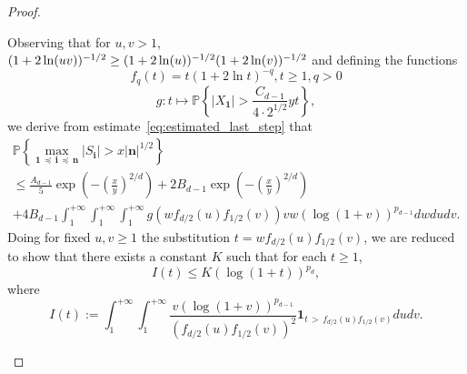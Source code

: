 \documentclass[AHL,Unicode,longabstracts,published]{cedram}
\newcommand{\bfun}{\mathbf{1}}
\newcommand\PP{\mathbb{P}}
\newcommand{\pr}[1]{(#1)}
\newcommand{\gr}[1]{\bm{#1}}
\newcommand{\gri}{\bm{i}}
\newcommand{\grn}{\bm{n}}
\newcommand{\imd}{\preccurlyeq}
\begin{document}
\begin{proof}
\begin{itemize}
Observing that for $u,v>1$, $\pr{1+2\ln\pr{uv}}^{-1/2}\geq
\pr{1+2\ln\pr{u}}^{-1/2}\linebreak\pr{1+2\ln\pr{v}}^{-1/2}$ and defining the functions
\begin{equation}
f_q\pr{t}=t\left(1+2\ln t\right)^{-q}, t\geq 1, q>0
\end{equation}
\begin{equation}
g\colon t\mapsto \PP\left\{\left|X_{\gr{1}}\right|>
\frac{C_{d-1}}{4\cdot 2^{1/2}}yt \right\},
\end{equation}
we derive from estimate~\eqref{eq:estimated_last_step} that
\begin{multline}\label{eq:estimated_last_step_bis}
\PP\left\{\max_{\gr{1}\,\imd\,\gri\,\imd\,\gr{n}} \left|S_{\gri}\right| >x\left|\grn\right|^{1/2}\right\}\\
\leq
\frac{A_{d-1}}5\exp\left(-\left(\frac xy\right)^{2/d}\right)+ 2B_{d-1}\exp\left(-\left(\frac{x}{y}\right)^{2/d}\right) \\
+ 4B_{d-1}\int_1^{+\infty}\int_1^{+\infty}\int_1^{+\infty} g\left(w f_{d/2}\pr{u}f_{1/2}\pr{v}\right) vw\left(\log\pr{1+v}\right)^{p_{d-1}}dwdudv.
\end{multline}
Doing for fixed $u,v\geq 1$ the substitution $t=w f_{d/2}\pr{u}f_{1/2}\pr{v}$, we are reduced to show that there exists a constant $K$ such that for each $t\geq 1$,
\begin{equation}
I\pr{t}\leq K\left( \log\pr{1+t} \right)^{p_d},
\end{equation}
where
\begin{equation}
I\pr{t}:= \int_1^{+\infty}\int_1^{+\infty}\frac{v\left(\log\pr{1+v}\right)^{p_{d-1}} }{\left(f_{d/2}\pr{u}f_{1/2}\pr{v}\right)^2}
\bfun_{t\,>\,f_{d/2}\pr{u}f_{1/2}\pr{v}}du dv.
\end{equation}



\end{itemize}
\end{proof}
\end{document}
